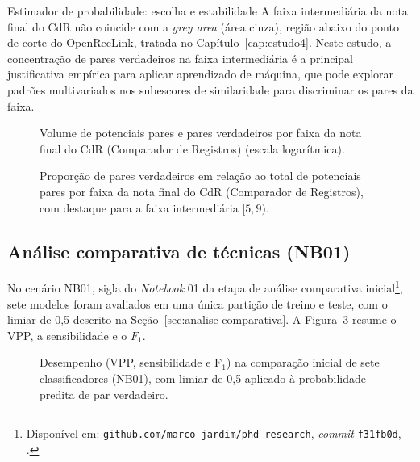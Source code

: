 \begin{chapter}{Estimador de probabilidade: escolha e estabilidade}
A faixa intermediária da nota final do CdR não coincide com a \textit{grey area} (área cinza), região abaixo do ponto de corte do OpenRecLink, tratada no Capítulo~\ref{cap:estudo4}. Neste estudo, a concentração de pares verdadeiros na faixa intermediária é a principal justificativa empírica para aplicar aprendizado de máquina, que pode explorar padrões multivariados nos subescores de similaridade para discriminar os pares da faixa.



\begin{figure}[!ht]
\centering

\caption{Volume de potenciais pares e pares verdadeiros por faixa da nota final do CdR (Comparador de Registros) (escala logarítmica).}
\label{fig:score-band-volume}
\end{figure}

\begin{figure}[!ht]
\centering

\caption{Proporção de pares verdadeiros em relação ao total de potenciais pares por faixa da nota final do CdR (Comparador de Registros), com destaque para a faixa intermediária $[5,9)$.}
\label{fig:score-band-pct}
\end{figure}

\subsection{Análise comparativa de técnicas (NB01)}\label{sec:e2-nb01}

No cenário NB01, sigla do \textit{Notebook} 01 da etapa de análise comparativa inicial\footnote{Disponível em: \href{https://github.com/marco-jardim/phd-research/blob/f31fb0dbc6edaff65ee12c19e2ff89e60bf0d9d8/notebooks/_executed/01_analise_comparativa_tecnicas.executed.ipynb}{\nolinkurl{github.com/marco-jardim/phd-research}, \textit{commit} \texttt{f31fb0d}, } \cite{Jardim2026phdrepo}.}, sete modelos foram avaliados em uma única partição de treino e teste, com o limiar de 0,5 descrito na Seção~\ref{sec:analise-comparativa}. A Figura~\ref{fig:nb01-model-comparison} resume o VPP, a sensibilidade e o $F_1$.

\begin{figure}[!ht]
\centering
\resizebox{\textwidth}{!}{}
\caption{Desempenho (VPP, sensibilidade e F$_1$) na comparação inicial de sete classificadores (NB01), com limiar de 0,5 aplicado à probabilidade predita de par verdadeiro.}
\label{fig:nb01-model-comparison}
\end{figure}


\end{chapter}
